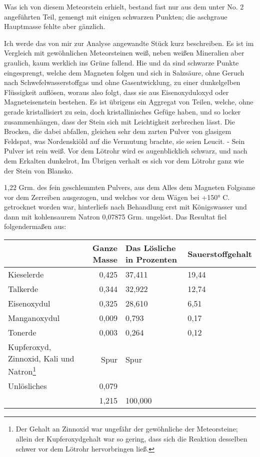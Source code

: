 \documentclass[a4paper, 11pt, oneside]{article}
\begin{document}
Was ich von diesem Meteorstein erhielt, bestand fast nur aus dem unter No. 2 angeführten Teil, gemengt mit einigen schwarzen Punkten; die aschgraue Hauptmasse fehlte aber gänzlich.

Ich werde das von mir zur Analyse angewandte Stück kurz beschreiben. Es ist im Vergleich mit gewöhnlichen Meteorsteinen weiß, neben weißen Mineralien aber graulich, kaum werklich ins Grüne fallend. Hie und da sind schwarze Punkte eingesprengt, welche dem Magneten folgen und sich in Salzsäure, ohne Geruch nach Schwefelwasserstoffgas und ohne Gasentwicklung, zu einer dunkelgelben Flüssigkeit auflösen, woraus also folgt, dass sie aus Eisenoxyduloxyd oder Magneteisenstein bestehen. Es ist übrigens ein Aggregat von Teilen, welche, ohne gerade kristallisiert zu sein, doch kristallinisches Gefüge haben, und so locker zusammenhängen, dass der Stein sich mit Leichtigkeit zerbrechen lässt. Die Brocken, die dabei abfallen, gleichen sehr dem zarten Pulver von glasigem Feldspat, was Nordenskiöld auf die Vermutung brachte, sie seien Leucit. - Sein Pulver ist rein weiß. Vor dem Lötrohr wird es augenblicklich schwarz, und nach dem Erkalten dunkelrot, Im Übrigen verhalt es sich vor dem Lötrohr ganz wie der Stein von Blansko.

1,22 Grm. des fein geschlemmten Pulvers, aus dem Alles dem Magneten Folgsame vor dem Zerreiben ausgezogen, und welches vor dem Wägen bei +150° C. getrocknet worden war, hinterliefs nach Behandlung erst mit Königswasser und dann mit kohlensaurem Natron 0,07875 Grm. ungelöst. Das Resultat fiel folgendermaßen aus:
\begin{center}
\begin{tabular}{ |p{30mm}|r|p{20mm}|p{24mm}| }
    \hline
     & Ganze Masse & Das Lösliche in Prozenten & Sauerstoffgehalt\\\hline
    Kieselerde & 0,425 & 37,411 & 19,44\\\hline
    Talkerde & 0,344 & 32,922 & 12,74\\\hline
    Eisenoxydul & 0,325 & 28,610 & 6,51\\\hline
    Manganoxydul & 0,009 & 0,793 & 0,17\\\hline
    Tonerde & 0,003 & 0,264 & 0,12\\\hline
    Kupferoxyd, Zinnoxid, Kali und Natron\footnote{Der Gehalt an Zinnoxid war ungefähr der gewöhnliche der Meteorsteine; allein der Kupferoxydgehalt war so gering, dass sich die Reaktion desselben schwer vor dem Lötrohr hervorbringen ließ.} & Spur & Spur & \\\hline
    Unlösliches & 0,079 & & \\\hline
     & 1,215 & 100,000 & \\
    \hline
\end{tabular}
\end{center}
\end{document}
